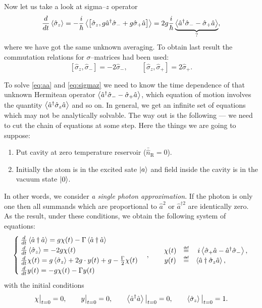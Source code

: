 Now let us take a look at sigma--$z$ operator
\begin{equation}
	\frac{d}{dt} \left\langle {\hat{\sigma}_z} \right\rangle = -\frac{i}{\hbar} \left\langle {\left[ \hat{\sigma}_z, g \hat{a}^{\dagger}\hat{\sigma}_- + g \hat{\sigma}_+ \hat{a} \right]} \right\rangle = 2 g\frac{i}{\hbar} \underbrace{\left\langle {\hat{a}^{\dagger}\hat{\sigma}_- - \hat{\sigma}_+ \hat{a}} \right\rangle}_{?},
	\label{eq:sigmaz}
\end{equation}
where we have got the same unknown averaging. To obtain last result the commutation relations for $\sigma$--matrices had been used:
\begin{equation}
	\left[ \hat{\sigma}_z, \hat{\sigma}_- \right] = - 2 \hat{\sigma}_-, \qquad
	\left[ \hat{\sigma}_z, \hat{\sigma}_+ \right] = 2 \hat{\sigma}_+.
\end{equation}

To solve \eqref{eq:aa} and \eqref{eq:sigmaz} we need to know the time dependence of that unknown Hermitean operator $\left\langle {\hat{a}^{\dagger}\hat{\sigma}_- - \hat{\sigma}_+ \hat{a}} \right\rangle$, which equation of motion involves the quantity $\left\langle {\hat{a}^{\dagger}\hat{\sigma}_z \hat{a}} \right\rangle$ and so on. In general, we get an infinite set of equations which may not be analytically solvable. The way out is the following --- we need to cut the chain of equations at some step. Here the things we are going to suppose:
\begin{enumerate}
	\item Put cavity at zero temperature reservoir ($\bar{\hat{n}}_{\text{R}} = 0$).
	\item Initially the atom is in the excited sate $\left\lvert {a} \right\rangle$ and field inside the cavity is in the vacuum state $\left\lvert {0} \right\rangle$.
\end{enumerate}
In other words, we consider \textit{a single photon approximation}. If the photon is only one then all summands which are proportional to $\hat{a}^2$ or $\hat{a}^{\dagger 2}$ are identically zero. As the result, under these conditions, we obtain the following system of equations:
\begin{equation}
	\begin{cases}
		\frac{d}{dt} \av{\hat{a}\dagger\hat{a}} = g \chi(t) - \Gamma \av{\hat{a}\dagger\hat{a}} \\
		\frac{d}{dt} \av{\hat{\sigma}_z} = - 2 g \chi(t) \\
		\frac{d}{dt} \chi(t) = g \av{\hat{\sigma}_z} + 2 g \cdot y(t) + g - \frac{\Gamma}{2} \chi(t) \\
		\frac{d}{dt} y(t) = - g \chi(t) - \Gamma y(t)
	\end{cases},
	\qquad 
	\begin{matrix}
		\chi(t) &\myeq& i \av{\hat{\sigma}_+ \hat{a} - \hat{a}\dag\hat{\sigma}_-}, \\
		y(t) &\myeq& \av{\hat{a}\dagger\hat{\sigma}_z \hat{a}}, \qquad \quad \ 
	\end{matrix}
\end{equation}
with the initial conditions 
\begin{equation}
	\chi \big|_{t=0} = 0, \qquad y \big|_{t=0} = 0, \qquad \left\langle {\hat{a}^{\dagger}\hat{a}} \right\rangle \big|_{t=0} = 0, \qquad \left\langle {\hat{\sigma}_z} \right\rangle \big|_{t=0} = 1. 
\end{equation}

